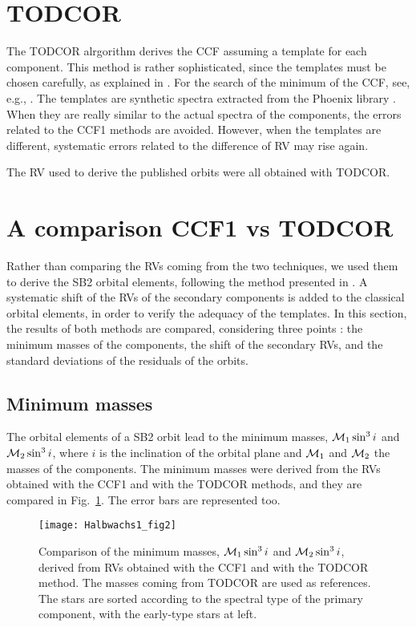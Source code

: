 \documentclass{sf2a-conf2017}
\begin{document}
\section{TODCOR}
The TODCOR alrgorithm \citep{TODCOR,TODCOR2} derives the CCF assuming a template for each component. This method is rather
sophisticated, since the templates must be chosen carefully, as explained in \cite{paper3}. For the search
of the minimum of the CCF, see, e.g., \cite{sf2a2013}.
The templates are synthetic spectra extracted from the Phoenix library \citep{Hauschildt99}. When they are really
similar to the actual spectra of the components, the errors related to the CCF1 methods
are avoided. However, when the templates are different, systematic errors related to the difference of
RV may rise again.

The RV used to derive the published orbits were all obtained with
TODCOR.

\section{A comparison CCF1 vs TODCOR}
Rather than comparing the RVs coming from the two techniques, we used them to derive the SB2 orbital elements,
following the method presented in \cite{paper3}. A systematic shift of the RVs of the secondary components is added
to the classical orbital elements, in order to verify the adequacy of the templates. In this section, the results
of both methods are compared, considering three points : the minimum masses of the components, 
the shift of the secondary RVs, and the standard deviations of the residuals of the orbits.

\subsection{Minimum masses}

The orbital elements of a SB2 orbit lead to the minimum masses, ${\cal M}_1 \sin^3 i$ and ${\cal M}_2 \sin^3 i$, where $i$ is the
inclination of the orbital plane and ${\cal M}_1$ and ${\cal M}_2$ the masses of the components. The minimum masses were derived
from the RVs obtained with the CCF1 and with the TODCOR methods, and they are compared in Fig.~\ref{Halbwachs1:fig2}. The error
bars are represented too.

\begin{figure}[ht!]
 \centering
 \texttt{[image: Halbwachs1\_fig2]}      
  \caption{Comparison of the minimum masses, ${\cal M}_1 \sin^3 i$ and ${\cal M}_2 \sin^3 i$, derived from RVs obtained
with the CCF1 and with the TODCOR method. The masses coming from TODCOR are used as references. The stars are sorted according to
the spectral type of the primary component, with the early-type stars at left.}
  \label{Halbwachs1:fig2}
\end{figure}
\end{document}

